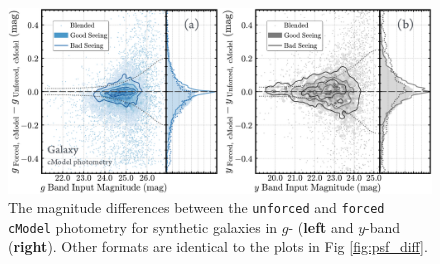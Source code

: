 \documentclass[useamsfonts]{pasj01}
\def\cmodel{\texttt{cModel}}
\def\forced{\texttt{forced}}
\def\unforced{\texttt{unforced}}
\begin{document}
\begin{figure}
    \begin{center}
        \includegraphics[width=\textwidth]{fig/synpipe_cmodel_diff}
    \end{center}
    \caption{
        The magnitude differences between the \unforced{} and \forced{}
        \cmodel{} photometry for synthetic galaxies in $g$- (\textbf{left} and 
        $y$-band (\textbf{right}). 
        Other formats are identical to the plots in Fig \ref{fig:psf_diff}.
        }
    \label{fig:cmodel_diff}
\end{figure}
\end{document}

